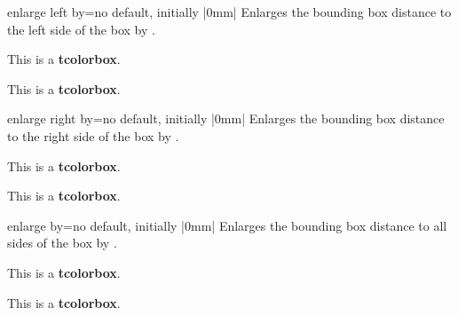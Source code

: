 \begin{docTcbKey}{enlarge left by}{=}{no default, initially |0mm|}
  Enlarges the bounding box distance to the left side of the box by .
\begin{dispExample}

\begin{tcolorbox}[enlarge left by=2cm,width=5cm,enhanced,show bounding box]
This is a \textbf{tcolorbox}.
\end{tcolorbox}
\begin{tcolorbox}[enlarge left by=-2cm,width=\linewidth+2cm]
This is a \textbf{tcolorbox}.
\end{tcolorbox}
\end{dispExample}
\end{docTcbKey}

\begin{docTcbKey}{enlarge right by}{=}{no default, initially |0mm|}
  Enlarges the bounding box distance to the right side of the box by .
\begin{dispExample}

\begin{tcolorbox}[enlarge right by=-2cm,width=\linewidth+2cm,
  enhanced,show bounding box]
This is a \textbf{tcolorbox}.
\end{tcolorbox}
\begin{tcolorbox}[enlarge right by=2cm,width=\linewidth-2cm]
This is a \textbf{tcolorbox}.
\end{tcolorbox}
\end{dispExample}
\end{docTcbKey}

\clearpage
\begin{docTcbKey}{enlarge by}{=}{no default, initially |0mm|}
  Enlarges the bounding box distance to all sides of the box by .
\begin{dispExample}

\begin{tcolorbox}
This is a \textbf{tcolorbox}.
\end{tcolorbox}
\begin{tcolorbox}[enlarge by=5mm,enhanced,show bounding box]
This is a \textbf{tcolorbox}.
\end{tcolorbox}
\end{dispExample}
\end{docTcbKey}



